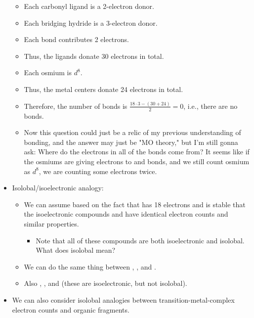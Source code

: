 \documentclass[../notes.tex]{subfiles}
\begin{document}
\begin{itemize}
\begin{figure}[h!]
        \label{fig:e-count-osmiumCompound}
    \end{figure}
    \begin{itemize}
        \item Each carbonyl ligand is a 2-electron donor.
        \item Each bridging hydride is a 3-electron donor.
        \item Each  bond contributes 2 electrons.
        \item Thus, the ligands donate 30 electrons in total.
        \item Each osmium is $d^8$.
        \item Thus, the metal centers donate 24 electrons in total.
        \item Therefore, the number of  bonds is $\frac{18\cdot 3-(30+24)}{2}=0$, i.e., there are no  bonds.
        \item Now this question could just be a relic of my previous understanding of bonding, and the answer may just be "MO theory," but I'm still gonna ask: Where do the electrons in all of the bonds come from? It seems like if the osmiums are giving electrons to  and  bonds, and we still count osmium as $d^8$, we are counting some electrons twice.
    \end{itemize}
    \item Isolobal/isoelectronic analogy:
    \begin{itemize}
        \item We can assume based on the fact that  has 18 electrons and is stable that the isoelectronic compounds  and  have identical electron counts and similar properties.
        \begin{itemize}
            \item Note that all of these compounds are both isoelectronic and isolobal. What does isolobal mean?
        \end{itemize}
        \item We can do the same thing between , , and .
        \item Also , \ce{[CpMn(CO)2]-}, and  (these are isoelectronic, but not isolobal).
    \end{itemize}
    \item We can also consider isolobal analogies between transition-metal-complex electron counts and organic fragments.
    \begin{itemize}

\end{itemize}
\end{itemize}
\end{document}

